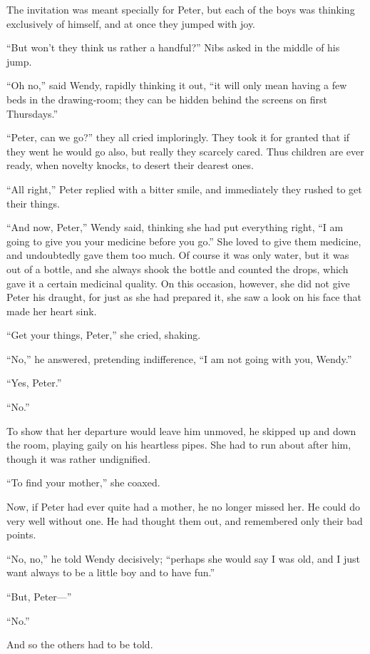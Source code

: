 The invitation was meant specially for Peter,
but each of the boys was thinking exclusively of himself, and at once they jumped with joy.

“But won’t they think us rather a handful?\@” Nibs asked in the middle of his jump.

“Oh no,” said Wendy, rapidly thinking it out,
“it will only mean having a few beds in the drawing‐room;
they can be hidden behind the screens on first Thursdays.”

“Peter, can we go?\@” they all cried imploringly.
They took it for granted that if they went he would go also,
but really they scarcely cared.
Thus children are ever ready, when novelty knocks, to desert their dearest ones.

“All right,” Peter replied with a bitter smile,
and immediately they rushed to get their things.

“And now, Peter,” Wendy said, thinking she had put everything right,
“I am going to give you your medicine before you go.”
She loved to give them medicine, and undoubtedly gave them too much.
Of course it was only water, but it was out of a bottle,
and she always shook the bottle and counted the drops, which gave it a certain medicinal quality.
On this occasion, however, she did not give Peter his draught,
for just as she had prepared it, she saw a look on his face that made her heart sink.

“Get your things, Peter,” she cried, shaking.

“No,” he answered, pretending indifference, “I am not going with you, Wendy.”

“Yes, Peter.”

“No.”

To show that her departure would leave him unmoved,
he skipped up and down the room, playing gaily on his heartless pipes.
She had to run about after him, though it was rather undignified.

“To find your mother,” she coaxed.

Now, if Peter had ever quite had a mother, he no longer missed her.
He could do very well without one.
He had thought them out, and remembered only their bad points.

“No, no,” he told Wendy decisively;
“perhaps she would say I was old, and I just want always to be a little boy and to have fun.”

“But, Peter—”

“No.”

And so the others had to be told.

